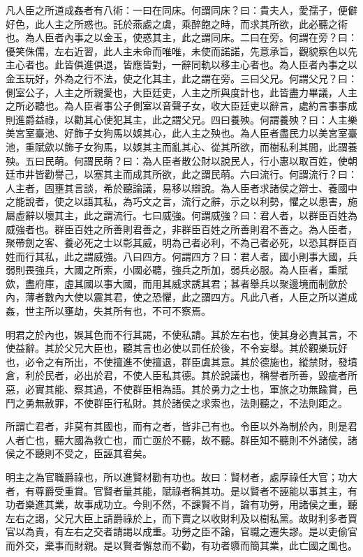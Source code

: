 
\begin{pinyinscope}
凡人臣之所道成姦者有八術：一曰在同床。何謂同床？曰：貴夫人，愛孺子，便僻好色，此人主之所惑也。託於燕處之虞，乘醉飽之時，而求其所欲，此必聽之術也。為人臣者內事之以金玉，使惑其主，此之謂同床。二曰在旁。何謂在旁？曰：優笑侏儒，左右近習，此人主未命而唯唯，未使而諾諾，先意承旨，觀貌察色以先主心者也。此皆俱進俱退，皆應皆對，一辭同軌以移主心者也。為人臣者內事之以金玉玩好，外為之行不法，使之化其主，此之謂在旁。三曰父兄。何謂父兄？曰：側室公子，人主之所親愛也，大臣廷吏，人主之所與度計也，此皆盡力畢議，人主之所必聽也。為人臣者事公子側室以音聲子女，收大臣廷吏以辭言，處約言事事成則進爵益祿，以勸其心使犯其主，此之謂父兄。四曰養殃。何謂養殃？曰：人主樂美宮室臺池、好飾子女狗馬以娛其心，此人主之殃也。為人臣者盡民力以美宮室臺池，重賦歛以飾子女狗馬，以娛其主而亂其心、從其所欲，而樹私利其間，此謂養殃。五曰民萌。何謂民萌？曰：為人臣者散公財以說民人，行小惠以取百姓，使朝廷市井皆勸譽己，以塞其主而成其所欲，此之謂民萌。六曰流行。何謂流行？曰：人主者，固壅其言談，希於聽論議，易移以辯說。為人臣者求諸侯之辯士、養國中之能說者，使之以語其私，為巧文之言，流行之辭，示之以利勢，懼之以患害，施屬虛辭以壞其主，此之謂流行。七曰威強。何謂威強？曰：君人者，以群臣百姓為威強者也。群臣百姓之所善則君善之，非群臣百姓之所善則君不善之。為人臣者，聚帶劍之客、養必死之士以彰其威，明為己者必利，不為己者必死，以恐其群臣百姓而行其私，此之謂威強。八曰四方。何謂四方？曰：君人者，國小則事大國，兵弱則畏強兵，大國之所索，小國必聽，強兵之所加，弱兵必服。為人臣者，重賦歛，盡府庫，虛其國以事大國，而用其威求誘其君；甚者舉兵以聚邊境而制歛於內，薄者數內大使以震其君，使之恐懼，此之謂四方。凡此八者，人臣之所以道成姦，世主所以壅劫，失其所有也，不可不察焉。

明君之於內也，娛其色而不行其謁，不使私請。其於左右也，使其身必責其言，不使益辭。其於父兄大臣也，聽其言也必使以罰任於後，不令妄舉。其於觀樂玩好也，必令之有所出，不使擅進不使擅退，群臣虞其意。其於德施也，縱禁財，發墳倉，利於民者，必出於君，不使人臣私其德。其於說議也，稱譽者所善，毀疵者所惡，必實其能、察其過，不使群臣相為語。其於勇力之士也，軍旅之功無踰賞，邑鬥之勇無赦罪，不使群臣行私財。其於諸侯之求索也，法則聽之，不法則距之。

所謂亡君者，非莫有其國也，而有之者，皆非己有也。令臣以外為制於內，則是君人者亡也，聽大國為救亡也，而亡亟於不聽，故不聽。群臣知不聽則不外諸侯，諸侯之不聽則不受之，臣誣其君矣。

明主之為官職爵祿也，所以進賢材勸有功也。故曰：賢材者，處厚祿任大官；功大者，有尊爵受重賞。官賢者量其能，賦祿者稱其功。是以賢者不誣能以事其主，有功者樂進其業，故事成功立。今則不然，不課賢不肖，論有功勞，用諸侯之重，聽左右之謁，父兄大臣上請爵祿於上，而下賣之以收財利及以樹私黨。故財利多者買官以為貴，有左右之交者請謁以成重。功勞之臣不論，官職之遷失謬。是以吏偷官而外交，棄事而財親。是以賢者懈怠而不勸，有功者隳而簡其業，此亡國之風也。


\end{pinyinscope}